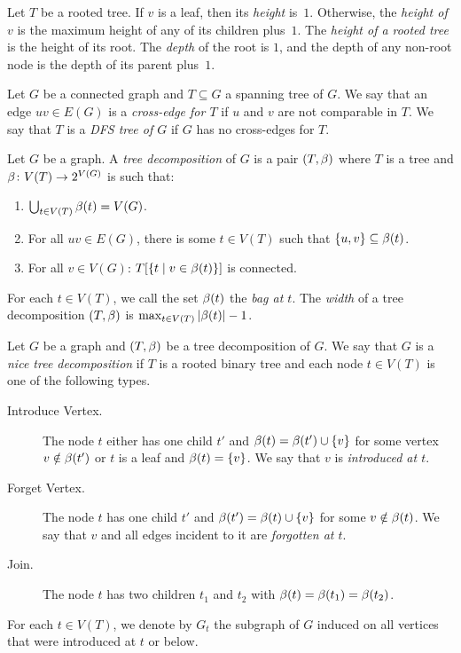 \documentclass[a4paper,11pt]{article}
\begin{document}
Let $T$ be a rooted tree.
If $v$ is a leaf, then its \emph{height} is~$1$.
Otherwise, the \emph{height of $v$} is the maximum height of any of its children plus~$1$.
The \emph{height of a rooted tree} is the height of its root.
%
The \emph{depth} of the root is $1$, 
and the depth of any non-root node is the depth of its parent plus~$1$.
%

Let $G$ be a connected graph and $T \subseteq G$ a spanning tree of $G$.
We say that an edge $uv \in E(G)$ is a \emph{cross-edge for $T$} if $u$ and $v$ are not comparable in $T$.
We say that $T$ is a \emph{DFS tree of $G$} if $G$ has no cross-edges for $T$.

%
\begin{definition}\label{def:td}
    Let $G$ be a graph.
    A \emph{tree decomposition} of $G$ is a pair $(T, \beta)$ 
    where $T$ is a tree and $\beta \colon V(T) \to 2^{V(G)}$ is such that:
    \begin{enumerate}
        \item $\bigcup_{t \in V(T)} \beta(t) = V(G)$.
        \item For all $uv \in E(G)$, there is some $t \in V(T)$ such that $\{u, v\} \subseteq \beta(t)$.
        \item For all $v \in V(G)$: $T[\{t \mid v \in \beta(t)\}]$ is connected.
    \end{enumerate}
    For each $t \in V(T)$, we call the set $\beta(t)$ the \emph{bag at $t$}.
    The \emph{width} of a tree decomposition $(T, \beta)$ is $\max_{t \in V(T)} |\beta(t)| - 1$.
\end{definition}

\begin{definition}\label{def:nice:td}
    Let $G$ be a graph and $(T, \beta)$ be a tree decomposition of $G$.
    We say that $G$ is a \emph{nice tree decomposition} 
    if $T$ is a rooted binary tree and each node $t \in V(T)$ is one of the following types.
    \begin{description}
        \item[Introduce Vertex.] The node $t$ either has one child $t'$ and $\beta(t) = \beta(t') \cup \{v\}$ for some vertex $v \notin \beta(t')$ or $t$ is a leaf and $\beta(t) = \{v\}$.
        We say that $v$ is \emph{introduced at $t$}.
        \item[Forget Vertex.] The node $t$ has one child $t'$ and $\beta(t') = \beta(t) \cup \{v\}$ for some $v \notin \beta(t)$.
        We say that $v$ and all edges incident to it are \emph{forgotten at $t$}.
        \item[Join.] The node $t$ has two children $t_1$ and $t_2$ with $\beta(t) = \beta(t_1) = \beta(t_2)$.
    \end{description}
    For each $t \in V(T)$, we denote by $G_t$ the subgraph of $G$ induced on all vertices that were introduced at $t$ or below.
\end{definition}
\end{document}
